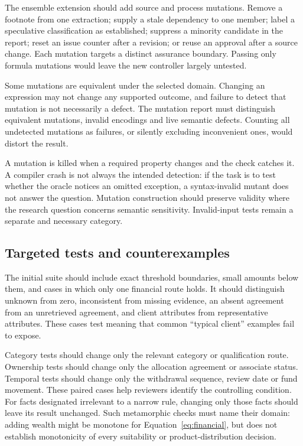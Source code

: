 \documentclass[12pt,a4paper,oneside,openany]{book}
\begin{document}
The ensemble extension should add source and process mutations. Remove a footnote
from one extraction; supply a stale dependency to one member; label a speculative
classification as established; suppress a minority candidate in the report; reset
an issue counter after a revision; or reuse an approval after a source change.
Each mutation targets a distinct assurance boundary. Passing only formula
mutations would leave the new controller largely untested.

Some mutations are equivalent under the selected domain. Changing an expression
may not change any supported outcome, and failure to detect that mutation is not
necessarily a defect. The mutation report must distinguish equivalent mutations,
invalid encodings and live semantic defects. Counting all undetected mutations as
failures, or silently excluding inconvenient ones, would distort the result.

A mutation is killed when a required property changes and the check catches it.
A compiler crash is not always the intended detection: if the task is to test
whether the oracle notices an omitted exception, a syntax-invalid mutant does not
answer the question. Mutation construction should preserve validity where the
research question concerns semantic sensitivity. Invalid-input tests remain a
separate and necessary category.

\subsection{Targeted tests and counterexamples}
\label{merge:P-04-prototype:05}


The initial suite should include exact threshold boundaries, small amounts below
them, and cases in which only one financial route holds. It should distinguish
unknown from zero, inconsistent from missing evidence, an absent agreement from
an unretrieved agreement, and client attributes from representative attributes.
These cases test meaning that common ``typical client'' examples fail to expose.

Category tests should change only the relevant category or qualification route.
Ownership tests should change only the allocation agreement or associate status.
Temporal tests should change only the withdrawal sequence, review date or fund
movement. These paired cases help reviewers identify the controlling condition.
For facts designated irrelevant to a narrow rule, changing only those facts should
leave its result unchanged. Such metamorphic checks must name their domain:
adding wealth might be monotone for Equation~\eqref{eq:financial}, but does not
establish monotonicity of every suitability or product-distribution decision.
\end{document}
